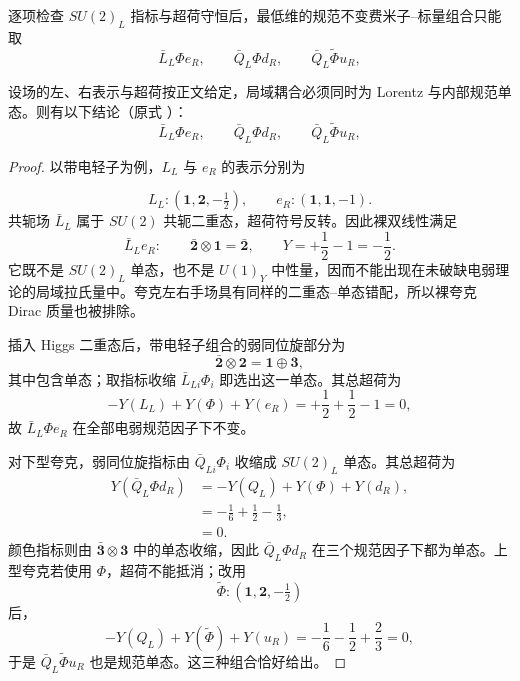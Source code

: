 逐项检查 $SU(2)_L$ 指标与超荷守恒后，最低维的规范不变费米子--标量组合只能取
\begin{equation}
 \boxed{
 \bar L_L\Phi e_R,
 \qquad
 \bar Q_L\Phi d_R,
 \qquad
 \bar Q_L\widetilde\Phi u_R,}
 \label{eq:sm-yukawa-invariant-structures-dp43}
\end{equation}

\begin{proposition}
设场的左、右表示与超荷按正文给定，局域耦合必须同时为 Lorentz 与内部规范单态。则有以下结论（原式 ）：
\begin{equation*}
 \boxed{
 \bar L_L\Phi e_R,
 \qquad
 \bar Q_L\Phi d_R,
 \qquad
 \bar Q_L\widetilde\Phi u_R,}
\end{equation*}
\end{proposition}
\begin{proof}
以带电轻子为例，$L_L$ 与 $e_R$ 的表示分别为

\begin{equation*}
 L_L:(\mathbf1,\mathbf2,-\tfrac12),
 \qquad
 e_R:(\mathbf1,\mathbf1,-1).
\end{equation*}
共轭场 $\bar L_L$ 属于 $SU(2)$ 共轭二重态，超荷符号反转。因此裸双线性满足
\begin{equation*}
 \bar L_L e_R:
 \qquad
 \bar{\mathbf2}\otimes\mathbf1=\bar{\mathbf2},
 \qquad
 Y=+\frac12-1=-\frac12.
\end{equation*}
它既不是 $SU(2)_L$ 单态，也不是 $U(1)_Y$ 中性量，因而不能出现在未破缺电弱理论的局域拉氏量中。夸克左右手场具有同样的二重态--单态错配，所以裸夸克 Dirac 质量也被排除。

插入 Higgs 二重态后，带电轻子组合的弱同位旋部分为
\begin{equation*}
 \bar{\mathbf2}\otimes\mathbf2
 =\mathbf1\oplus\mathbf3,
\end{equation*}
其中包含单态；取指标收缩 $\bar L_{Li}\Phi_i$ 即选出这一单态。其总超荷为
\begin{equation*}
 -Y(L_L)+Y(\Phi)+Y(e_R)
 =+\frac12+\frac12-1=0,
\end{equation*}
故 $\bar L_L\Phi e_R$ 在全部电弱规范因子下不变。

对下型夸克，弱同位旋指标由 $\bar Q_{Li}\Phi_i$ 收缩成 $SU(2)_L$ 单态。其总超荷为
\begin{align*}
 Y(\bar Q_L\Phi d_R)
 &=-Y(Q_L)+Y(\Phi)+Y(d_R),\\
 &=-\frac16+\frac12-\frac13,\\
 &=0.
\end{align*}
颜色指标则由 $\bar{\mathbf3}\otimes\mathbf3$ 中的单态收缩，因此 $\bar Q_L\Phi d_R$ 在三个规范因子下都为单态。上型夸克若使用 $\Phi$，超荷不能抵消；改用
\begin{equation*}
 \widetilde\Phi:(\mathbf1,\mathbf2,-\tfrac12)
\end{equation*}
后，
\begin{equation*}
 -Y(Q_L)+Y(\widetilde\Phi)+Y(u_R)
 =-\frac16-\frac12+\frac23=0,
\end{equation*}
于是 $\bar Q_L\widetilde\Phi u_R$ 也是规范单态。这三种组合恰好给出。
\end{proof}

